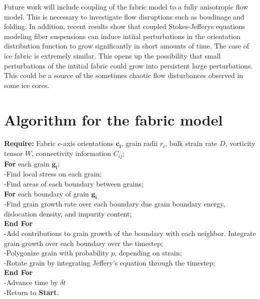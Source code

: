 \documentclass{article}
\begin{document}
Future work will include coupling of the fabric model to a fully anisotropic flow model. This is necessary to investigate flow disruptions such as boudinage and folding. In addition, recent results \citep{montgomery-smith2011} show that coupled Stokes-Jefferys equations modeling fiber suspensions can induce intiial perturbations in the orientation distribution function to grow significantly in short amounts of time. The case of ice fabric is extremely similar. This opens up the possibility that small perturbations of the intitial fabric could grow into persistent large perturbations. This could be a source of the sometimes chaotic flow disturbances observed in some ice cores.




\appendix
\section{Algorithm for the fabric model}

\textbf{Require:} Fabric c-axis orientations $\mathbf{c_i}$, grain radii $r_i$, bulk strain rate $D$, vorticity tensor  $W$, connectivity information $C_{ij}$;
\\
\textbf{For} each grain $\mathbf{g_i}$:
\\
\intent -Find local stress on each grain;
\\
\indent -Find areas of each boundary between grains;
\\
\textbf{For} each boundary of grain $\mathbf{g_i}$
\\
\indent -Find grain growth rate over each boundary due grain boundary energy, dislocation density, and impurity content;
\\
\textbf{End For}
\\
\indent -Add contributions to grain growth of the boundary with each neighbor. Integrate grain growth over each boundary over the timestep;
\\
\indent -Polygonize grain with probability $p$, depending on strain;
\\
\indent -Rotate grain by integrating Jeffery's equation through the timestep;
\\
\textbf{End For}
\\
-Advance time by $\delta t$
\\
-Return to \textbf{Start}.
\end{document}
